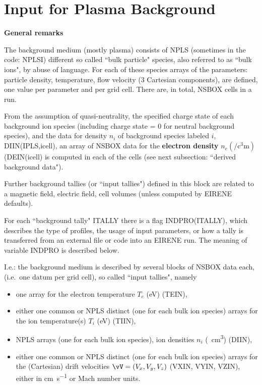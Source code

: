 \section{Input for Plasma Background} \label{sec2.5}

\textbf{General remarks}

\medskip

The background medium (mostly plasma) consists of NPLS (sometimes in the code:
NPLSI) different so called ``bulk particle" species, also referred to as ``bulk
ions", by abuse of language.
For each of these species arrays of the parameters: particle density,
temperature, flow velocity (3 Cartesian components),  are defined, one value
per parameter and per grid cell.
There are, in total, NSBOX cells in a run.

From the assumption of quasi-neutrality, the specified charge state of each
background ion species (including  charge state = 0 for neutral background
species), and the data for density $n_i$ of background species labeled $i$,
DIIN(IPLS,icell), an array of NSBOX data for the \textbf{electron density} $n_e
  (\si{\per\cubic\centi\metre} )$ (DEIN(icell) is computed in each of the cells
(see next subsection: ``derived background data").

Further background tallies (or ``input tallies") defined in this block are
related to a magnetic field, electric field, cell volumes (unless computed by
EIRENE defaults).

For each ``background tally" ITALLY there is a flag INDPRO(ITALLY), which
describes the type of profiles, the usage of input parameters, or how a tally
is transferred from an external file or code into an EIRENE run.
The meaning of variable INDPRO is described below.

I.e.: the background medium is described by several blocks of NSBOX data each,
(i.e.\ one datum per grid cell), so called ``input tallies", namely
\begin{itemize}
  \item one array for the electron temperature $T_e$
        (\si{\electronvolt}) (TEIN),
  \item either one common or NPLS distinct (one for
        each bulk ion species) arrays for the ion temperature(s) $T_i$
        (\si{\electronvolt}) (TIIN),
  \item NPLS arrays (one for each bulk ion species),
        ion densities $n_i$ (\si{\per\cubic\centi\metre}) (DIIN),
  \item either one
        common or NPLS distinct (one for each bulk ion species) arrays for the
        (Cartesian) drift velocities $\vV = ( V_x, V_y, V_z )$ (VXIN, VYIN, VZIN),
        either in \si{\centi\metre\per\second} or Mach number units.
\end{itemize}

